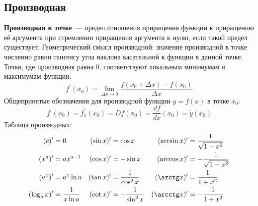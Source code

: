 \subsection{Производная}
\textbf{Производная в точке}~--- предел отношения приращения функции к приращению её аргумента при стремлении приращения аргумента к нулю, если такой предел существует. Геометрический смысл производной: значение производной в точке численно равно тангенсу угла наклона касательной к функции в данной точке. Точки, где производная равна 0, соответствуют локальным минимумам и максимумам функции.
\begin{equation}
f^\prime(x_0) = \lim_{\Delta x \to 0}\frac{f(x_0 + \Delta x) - f(x_0)}{\Delta x}
\end{equation}
Общепринятые обозначения для производной функции $y = f(x)$ в точке $x_0$:
\begin{equation}
f^\prime(x_0) = f^\prime_x(x_0) = D f(x_0) = \frac{d f}{d x}(x_0) = \dot{y} (x_0)
\end{equation}
Таблица производных:
\begin{align*}
(c)^\prime &= 0 & (\sin x)^\prime &= \cos x & (\arcsin x)^\prime &= \dfrac{1}{\sqrt{1 - x^2}} \\
(x^a)^\prime &= a x^{a-1} & (\cos x)^\prime &= - \sin x & (\arccos x)^\prime &= - \dfrac{1}{\sqrt{1 - x^2}} \\
(a^x)^\prime &= a^x \ln a & (\tan x)^\prime &= \dfrac{1}{\cos^2 x} & (\arctg x)^\prime &= \dfrac{1}{1 + x^2} \\
(\log_a x)^\prime &= \dfrac{1}{x \ln a} & (\cot x)^\prime &= - \dfrac{1}{\sin^2 x} & (\arcctg x)^\prime &= - \dfrac{1}{1 + x^2} 
\end{align*}

